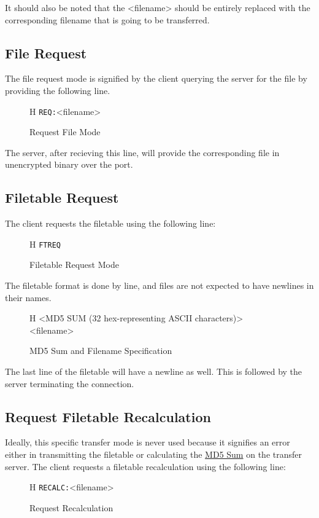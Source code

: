 \documentclass[12pt]{article}
\begin{document}
It should also be noted that the <filename> should be entirely replaced with
the corresponding filename that is going to be transferred.

\subsection{File Request}
\label{ssec:Request File}
The file request mode is signified by the client querying the server for the
file by providing the following line.
\begin{figure}{H}
	\centering
	\verb+REQ:+\textvisiblespace <filename>\carriagereturn\carriagereturn
	\caption{Request File Mode}
\end{figure}

The server, after recieving this line, will provide the corresponding file in
unencrypted binary over the port.

\subsection{Filetable Request}
\label{ssec:Request Filetable}
The client requests the filetable using the following line:
\begin{figure}{H}
	\centering
	\verb+FTREQ+\carriagereturn\carriagereturn
	\caption{Filetable Request Mode}
\end{figure}

The filetable format is done by line, and files are not expected to have
newlines in their names.
\begin{figure}{H}
	\centering
	<MD5 SUM (32 hex-representing ASCII characters)>\textvisiblespace
	\textvisiblespace<filename>\carriagereturn
	\caption{MD5 Sum and Filename Specification}
\end{figure}

The last line of the filetable will have a newline as well.  This is followed
by the server terminating the connection.

\subsection{Request Filetable Recalculation}
\label{ssec:Recalculate MD5}
Ideally, this specific transfer mode is never used because it signifies an
error either in transmitting the filetable or calculating the
\href{http://en.wikipedia.org/wiki/Md5sum}{MD5 Sum} on the transfer server.
The client requests a filetable recalculation using the following line:
\begin{figure}{H}
	\centering
	\verb+RECALC:+\textvisiblespace <filename>\carriagereturn\carriagereturn
	\caption{Request Recalculation}
\end{figure}
\end{document}
